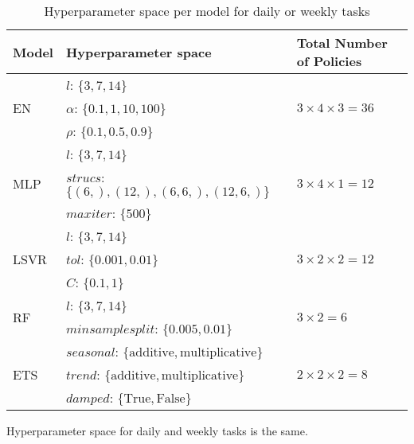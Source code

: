 \begin{center}
    \begin{table}[h!]
        \begin{tabular}{|l|l|l|} 
            \hline
            Model & Hyperparameter space & Total Number of Policies \\
            \hline\hline
            \multirow{3}{*}{EN}   & $l$: $\{3, 7, 14 \}$ & \multirow{3}{*}{$3 \times 4 \times 3 = 36$} \\
                                  & $\alpha$: $\{0.1, 1, 10, 100\}$ & \\
                                  & $\rho$: $\{0.1, 0.5, 0.9 \}$ & \\
            \hline
            \multirow{3}{*}{MLP}  & $l$: $\{3, 7, 14 \}$ & \multirow{3}{*}{$3 \times 4 \times 1 = 12$} \\
                                  & $strucs$: $\{(6, ), (12, ), (6, 6, ), (12, 6, )\}$ & \\
                                  & $maxiter$: $\{ 500\}$ & \\
            \hline
            \multirow{3}{*}{LSVR} & $l$: $\{3, 7, 14 \}$ & \multirow{3}{*}{$3 \times 2 \times 2 = 12$} \\
                                  & $tol$: $\{0.001, 0.01\}$ & \\
                                  & $C$: $\{0.1, 1\}$ & \\
            \hline
            \multirow{2}{*}{RF}   & $l$: $\{3, 7, 14 \}$ & \multirow{2}{*}{$3 \times 2 = 6$} \\
                                  & $min sample split$: $\{0.005, 0.01\}$ & \\
            \hline
            \multirow{3}{*}{ETS}  & $seasonal$: $\{\text{additive}, \text{multiplicative}\}$ & \multirow{3}{*}{$2 \times 2 \times 2 = 8$}  \\
                                  & $trend$: $\{\text{additive}, \text{multiplicative}\}$ & \\
                                  & $damped$: $\{\text{True}, \text{False}\}$ & \\
            \hline
        \end{tabular}
        \caption{ Hyperparameter space per model for daily or weekly tasks}
        {\raggedright Hyperparameter space for daily and weekly tasks is the same.\par}
        \label{tbl: hyper space daily/weekly}
    \end{table}
\end{center}
